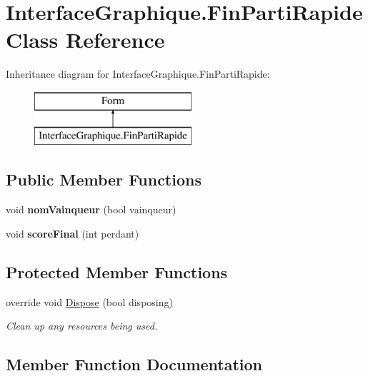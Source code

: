 \hypertarget{class_interface_graphique_1_1_fin_parti_rapide}{}\section{Interface\+Graphique.\+Fin\+Parti\+Rapide Class Reference}
\label{class_interface_graphique_1_1_fin_parti_rapide}
Inheritance diagram for Interface\+Graphique.\+Fin\+Parti\+Rapide\+:\begin{figure}[H]
\begin{center}
\leavevmode
\includegraphics[height=2.000000cm]{class_interface_graphique_1_1_fin_parti_rapide}
\end{center}
\end{figure}
\subsection*{Public Member Functions}
\begin{DoxyCompactItemize}
\item 
void {\bfseries nom\+Vainqueur} (bool vainqueur)
\item 
void {\bfseries score\+Final} (int perdant)
\end{DoxyCompactItemize}
\subsection*{Protected Member Functions}
\begin{DoxyCompactItemize}
\item 
override void \hyperlink{class_interface_graphique_1_1_fin_parti_rapide_a8134ad235e3ceac7c4f6bb06ae168972}{Dispose} (bool disposing)
\begin{DoxyCompactList}\small\item\em Clean up any resources being used. \end{DoxyCompactList}\end{DoxyCompactItemize}


\subsection{Member Function Documentation}
\hypertarget{class_interface_graphique_1_1_fin_parti_rapide_a8134ad235e3ceac7c4f6bb06ae168972}{}\label{class_interface_graphique_1_1_fin_parti_rapide_a8134ad235e3ceac7c4f6bb06ae168972} 

